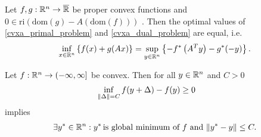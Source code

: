 \begin{theorem}
  \label{cvxa_fenchel_theorem}
  Let 
  $f, g : \mathbb{R}^n \to \overline{\mathbb{R}}$ 
  be proper convex functions
  and
  $0 \in \text{ri}(\text{dom}(g) - A (\text{dom}(f)) )$
  .
  Then the optimal values of \eqref{cvxa_primal_problem} and \eqref{cvxa_dual_problem} are equal, 
  i.e.
  \begin{gather}
    \inf_{x \in \mathbb{R}^n} 
    \left\{ f(x) + g(Ax) \right\}
    =
    \sup_{y \in \mathbb{R}^n} \left\{   -f^* \left( A^T y \right) - g^*(-y) \right\}
    .
  \end{gather}
\end{theorem}
\begin{proposition}
  \label{syu_1_result}
  Let 
  $f : \mathbb{R}^n \to (-\infty, \infty]$ 
  be convex.
  Then 
  for all $y \in \mathbb{R}^n$ and $C>0$ 
    \begin{gather}
      \label{7060_0}
      \inf_{\left\lVert\Delta\right\rVert=C} f(y+\Delta) - f(y) \ge 0 \qquad
    \end{gather}
  implies
  \begin{gather}
    \label{7060_1}
    \exists y^* \in \mathbb{R}^n
    :
    y^* \,\text{is global minimum of $f$ and}\,
      \left\lVert y^* - y\right\rVert \le C.
  \end{gather}
\end{proposition}
